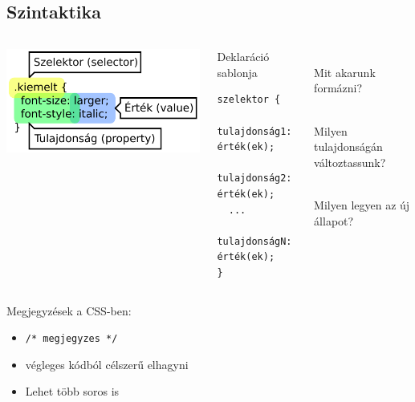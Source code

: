 \subsection{Szintaktika}

\begin{frame}[fragile]
  \begin{columns}[c]
      \includegraphics[scale=0.75]{szintakszis.pdf}\\
      \begin{block}{Deklaráció sablonja}
      \vspace{-0.5cm}
\begin{verbatim}
szelektor {
  tulajdonság1: érték(ek);
  tulajdonság2: érték(ek);
  ...
  tulajdonságN: érték(ek);
}
\end{verbatim}
      \vspace{-0.4cm}
      \end{block}
      \begin{description}[m]
        \item[Szelektor] \hfill \\ Mit akarunk formázni?
        \item[Tulajdonság] \hfill \\ Milyen tulajdonságán változtassunk?
        \item[Érték] \hfill \\ Milyen legyen az új állapot?
      \end{description}
  \end{columns}
  
\end{frame}

\begin{frame}
  Megjegyzések a CSS-ben:
  \begin{itemize}
    \item \texttt{/* megjegyzes */}
    \item végleges kódból célszerű elhagyni
    \item Lehet több soros is
  \end{itemize} 
\end{frame}
